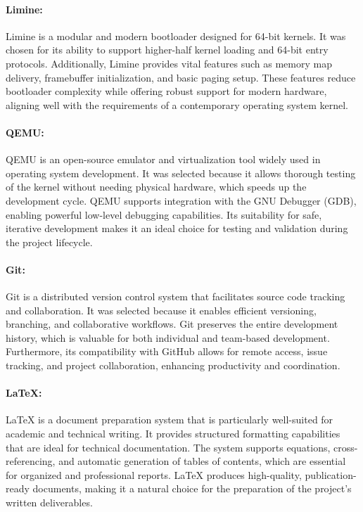 \documentclass[12pt]{extarticle}
\begin{document}
\paragraph{Limine:}
Limine is a modular and modern bootloader designed for 64-bit kernels. It was
chosen for its ability to support higher-half kernel loading and 64-bit entry
protocols. Additionally, Limine provides vital features such as memory map
delivery, framebuffer initialization, and basic paging setup. These features
reduce bootloader complexity while offering robust support for modern hardware,
aligning well with the requirements of a contemporary operating system kernel.

\paragraph{QEMU:}
QEMU is an open-source emulator and virtualization tool widely used in operating
system development. It was selected because it allows thorough testing of the
kernel without needing physical hardware, which speeds up the development cycle.
QEMU supports integration with the GNU Debugger (GDB), enabling powerful
low-level debugging capabilities. Its suitability for safe, iterative
development makes it an ideal choice for testing and validation during the
project lifecycle.

\paragraph{Git:}
Git is a distributed version control system that facilitates source code
tracking and collaboration. It was selected because it enables efficient
versioning, branching, and collaborative workflows. Git preserves the entire
development history, which is valuable for both individual and team-based
development. Furthermore, its compatibility with GitHub allows for remote
access, issue tracking, and project collaboration, enhancing productivity and
coordination.

\paragraph{\LaTeX{}:}
\LaTeX{} is a document preparation system that is particularly well-suited for
academic and technical writing. It provides structured formatting capabilities
that are ideal for technical documentation. The system supports equations,
cross-referencing, and automatic generation of tables of contents, which are
essential for organized and professional reports. \LaTeX{} produces
high-quality, publication-ready documents, making it a natural choice for the
preparation of the project's written deliverables.
\end{document}
